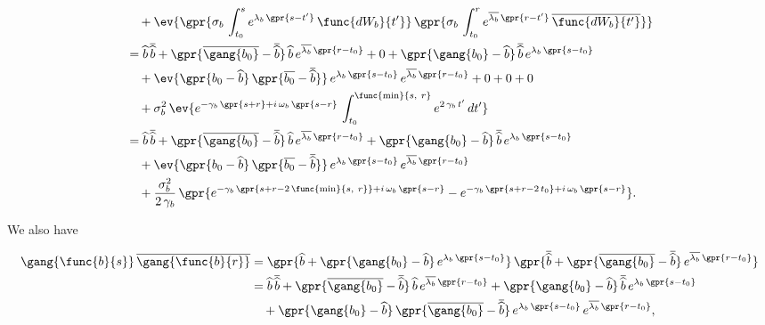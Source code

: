 \begin{align}
    		&\quad + \ev{\gpr{\sigma_{b}\,\int_{t_{0}}^{s} e^{\lambda_b\,\gpr{s - t'}}\,\func{d{W}_{b}}{t'}}\,\gpr{\sigma_{b}\,\int_{t_{0}}^{r} e^{\overline{\lambda_b}\,\gpr{r - t'}}\,\overline{\func{d{W}_{b}}{t'}}}} \nonumber \\
    		&= \widehat{b}\,\overline{\widehat{b}} + \gpr{\overline{\gang{b_0}} - \overline{\widehat{b}}}\,\widehat{b}\,e^{\overline{\lambda_{b}}\,\gpr{r - t_0}} + 0  + \gpr{\gang{b_0} - \widehat{b}}\,\overline{\widehat{b}}\,e^{\lambda_{b}\,\gpr{s - t_0}} \nonumber \\
    		&\quad + \ev{\gpr{b_0 - \widehat{b}}\,\gpr{\overline{b_0} - \overline{\widehat{b}}}}\,e^{\lambda_{b}\,\gpr{s - t_0}}\,e^{\overline{\lambda_{b}}\,\gpr{r - t_0}} + 0 + 0 + 0 \nonumber \\
    		&\quad + \sigma_{b}^{2}\,\ev{e^{-\gamma_{b}\,\gpr{s + r} + i\,\omega_{b}\,\gpr{s - r}}\,\int_{t_{0}}^{\func{\text{min}}{s,\ r}} e^{2\,\gamma_{b}\,t'}\,dt'} \nonumber \\
    		&= \widehat{b}\,\overline{\widehat{b}} + \gpr{\overline{\gang{b_0}} - \overline{\widehat{b}}}\,\widehat{b}\,e^{\overline{\lambda_{b}}\,\gpr{r - t_0}}  + \gpr{\gang{b_0} - \widehat{b}}\,\overline{\widehat{b}}\,e^{\lambda_{b}\,\gpr{s - t_0}} \nonumber \\
    		&\quad + \ev{\gpr{b_0 - \widehat{b}}\,\gpr{\overline{b_0} - \overline{\widehat{b}}}}\,e^{\lambda_{b}\,\gpr{s - t_0}}\,e^{\overline{\lambda_{b}}\,\gpr{r - t_0}} \nonumber \\
    		&\quad + \frac{\sigma_{b}^{2}}{2\,\gamma_{b}}\,\gpr{e^{-\gamma_{b}\,\gpr{s + r - 2\,\func{\text{min}}{s,\ r}} + i\,\omega_{b}\,\gpr{s - r}} - e^{-\gamma_{b}\,\gpr{s + r - 2\,t_{0}} + i\,\omega_{b}\,\gpr{s - r}}}.
\end{align}

We also have

\begin{align}
    \gang{\func{b}{s}}\,\overline{\gang{\func{b}{r}}} &= \gpr{\widehat{b} + \gpr{\gang{b_0} - \widehat{b}}\,e^{\lambda_{b}\,\gpr{s - t_0}}}\,\gpr{\overline{\widehat{b}} + \gpr{\overline{\gang{b_0}} - \overline{\widehat{b}}}\,e^{\overline{\lambda_{b}}\,\gpr{r - t_0}}} \nonumber \\
    	&= \widehat{b}\,\overline{\widehat{b}} + \gpr{\overline{\gang{b_0}} - \overline{\widehat{b}}}\,\widehat{b}\,e^{\overline{\lambda_{b}}\,\gpr{r - t_0}}  + \gpr{\gang{b_0} - \widehat{b}}\,\overline{\widehat{b}}\,e^{\lambda_{b}\,\gpr{s - t_0}} \nonumber \\
    		&\quad + \gpr{\gang{b_0} - \widehat{b}}\,\gpr{\overline{\gang{b_0}} - \overline{\widehat{b}}}\,e^{\lambda_{b}\,\gpr{s - t_0}}\,e^{\overline{\lambda_{b}}\,\gpr{r - t_0}},
\end{align}

